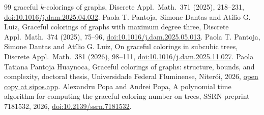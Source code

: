 \documentclass[11pt]{article}
\theoremstyle{remark}
\begin{document}
\begin{thebibliography}{99}
graceful $k$-colorings of graphs, Discrete Appl.\ Math.\ 371 (2025), 218--231,
\href{https://doi.org/10.1016/j.dam.2025.04.032}{doi:10.1016/j.dam.2025.04.032}.
 Paola T. Pantoja, Simone Dantas and Atílio G. Luiz, Graceful
colorings of graphs with maximum degree three, Discrete Appl.\ Math.\ 374
(2025), 75--96,
\href{https://doi.org/10.1016/j.dam.2025.05.013}{doi:10.1016/j.dam.2025.05.013}.
 Paola T. Pantoja, Simone Dantas and Atílio G. Luiz, On graceful
colorings in subcubic trees, Discrete Appl.\ Math.\ 381 (2026), 98--111,
\href{https://doi.org/10.1016/j.dam.2025.11.027}{doi:10.1016/j.dam.2025.11.027}.
 Paola Tatiana Pantoja Huaynoca, Graceful colorings of graphs:
structure, bounds, and complexity, doctoral thesis, Universidade Federal
Fluminense, Niterói, 2026,
\href{https://sipos.app/pgmat/administracao/defesas/documentos/2026.03.23-14.56.04Tese\%20Paola\%20Tatiana\%20Pantoja\%20H.pdf}{open copy at sipos.app}.
 Alexandru Popa and Andrei Popa, A polynomial time algorithm for
computing the graceful coloring number on trees, SSRN preprint 7181532, 2026,
\href{https://doi.org/10.2139/ssrn.7181532}{doi:10.2139/ssrn.7181532}.
\end{thebibliography}
\end{document}
